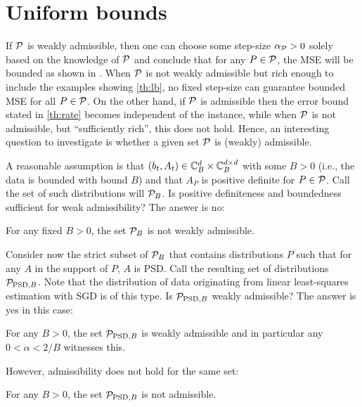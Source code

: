 \section{Uniform bounds}\label{sec:uniform}
If $\P$ is weakly admissible, 
then one can choose some step-size $\alpha_{\P}>0$ solely based on the knowledge of $\P$ and
conclude that for any $P\in \P$, the MSE will be bounded as shown in . 
When $\P$ is not weakly admissible but rich enough to include the examples showing \cref{th:lb}, 
no fixed step-size can guarantee bounded MSE for all $P\in \P$.
On the other hand, if $\P$ is admissible then the error bound stated in  \cref{th:rate} becomes independent of the instance,
while when $\P$ is not admissible, but ``sufficiently rich'', this does not hold.
Hence, an interesting question to investigate is whether a given set $\P$ is (weakly) admissible. 

A reasonable assumption is that $(b_t,A_t)\in \C_B^{d}\times \C_B^{\dcd}$ with some $B>0$ (i.e., the data  is bounded with bound $B$) and that $A_P$ is positive definite for $P\in \P$. Call the set of such distributions will $\P_B$.
Is positive definiteness and boundedness sufficient for weak admissibility? The answer is no:
\begin{proposition}\label{lm:notwad}
For any fixed $B>0$,
the set $\P_B$ is not weakly admissible.
\end{proposition}
Consider now the strict subset of $\P_B$ that contains distributions $P$ such that for any $A$ in the support of $P$, $A$ is PSD.
Call the resulting set of distributions $\P_{\text{PSD},B}$.
Note that the distribution of data originating from linear least-squares estimation with SGD is of this type.
Is $\P_{\text{PSD},B}$ weakly admissible? The answer is yes in this case:
\begin{proposition}\label{lm:ppsdbwd}
For any $B>0$, the set $\P_{\text{PSD},B}$ is weakly admissible
and in particular any $0<\alpha < 2/B$ witnesses this.%
\end{proposition}
However, admissibility does not hold for the same set:
\begin{proposition}\label{lm:ppsdbna}
For any $B>0$, the set $\P_{\text{PSD},B}$ is not admissible.
\end{proposition}

